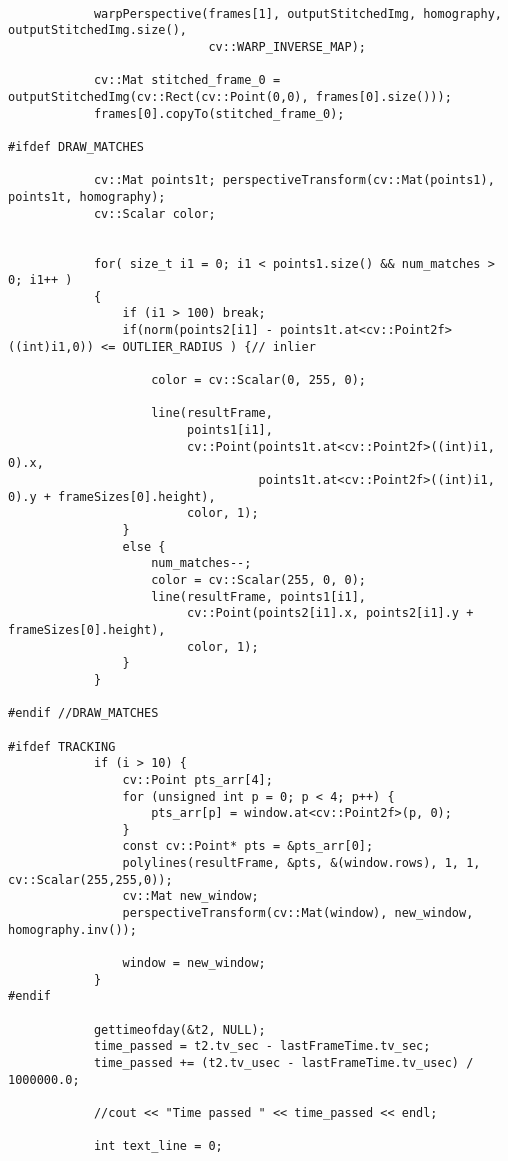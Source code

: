 \begin{lstlisting}
            
            warpPerspective(frames[1], outputStitchedImg, homography, outputStitchedImg.size(),
                            cv::WARP_INVERSE_MAP);
            
            cv::Mat stitched_frame_0 = outputStitchedImg(cv::Rect(cv::Point(0,0), frames[0].size()));
            frames[0].copyTo(stitched_frame_0);
            
#ifdef DRAW_MATCHES
            
			cv::Mat points1t; perspectiveTransform(cv::Mat(points1), points1t, homography);
			cv::Scalar color;
            
            
			for( size_t i1 = 0; i1 < points1.size() && num_matches > 0; i1++ )
			{		
                if (i1 > 100) break;
				if(norm(points2[i1] - points1t.at<cv::Point2f>((int)i1,0)) <= OUTLIER_RADIUS ) {// inlier
					
					color = cv::Scalar(0, 255, 0);
					
					line(resultFrame, 
                         points1[i1],
						 cv::Point(points1t.at<cv::Point2f>((int)i1, 0).x,
                                   points1t.at<cv::Point2f>((int)i1, 0).y + frameSizes[0].height),
						 color, 1);
				}
				else {
                    num_matches--;
                    color = cv::Scalar(255, 0, 0);
                    line(resultFrame, points1[i1],
                         cv::Point(points2[i1].x, points2[i1].y + frameSizes[0].height),
                         color, 1);
				}
			}
            
#endif //DRAW_MATCHES
            
#ifdef TRACKING
            if (i > 10) {
                cv::Point pts_arr[4];
                for (unsigned int p = 0; p < 4; p++) {
                    pts_arr[p] = window.at<cv::Point2f>(p, 0);
                }
                const cv::Point* pts = &pts_arr[0];
                polylines(resultFrame, &pts, &(window.rows), 1, 1, cv::Scalar(255,255,0));
                cv::Mat new_window;
                perspectiveTransform(cv::Mat(window), new_window, homography.inv());
                
                window = new_window;
            }
#endif
                        
			gettimeofday(&t2, NULL);
			time_passed = t2.tv_sec - lastFrameTime.tv_sec;
			time_passed += (t2.tv_usec - lastFrameTime.tv_usec) / 1000000.0; 
			
			//cout << "Time passed " << time_passed << endl;
			
			int text_line = 0;
			

\end{lstlisting}
